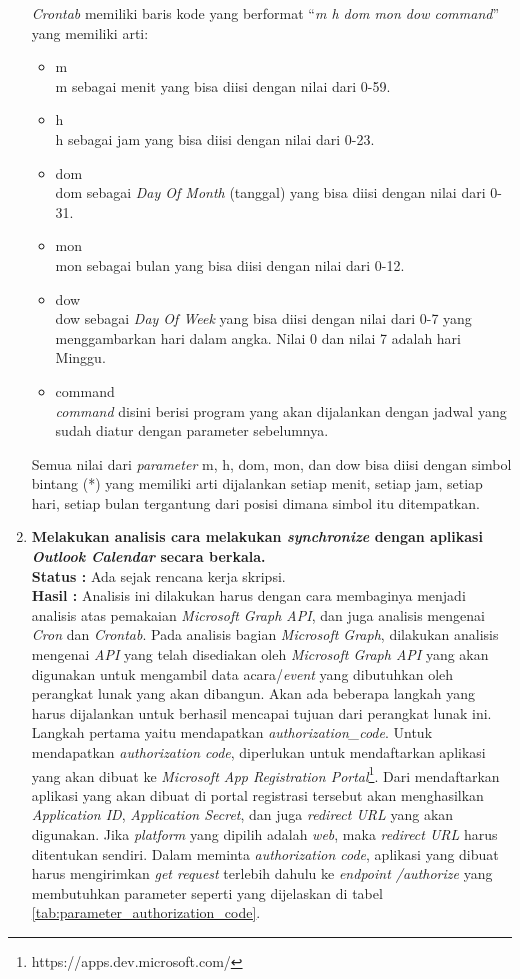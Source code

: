 \documentclass[a4paper,twoside]{article}
\begin{document}
\begin{enumerate}
\textit{Crontab} memiliki baris kode yang berformat ``\textit{m h dom mon dow command}'' yang memiliki arti:
\begin{itemize}
	\item m\\
	m sebagai menit yang bisa diisi dengan nilai dari 0-59. 
	\item h\\
	h sebagai jam yang bisa diisi dengan nilai dari 0-23.
	\item dom\\
	dom sebagai \textit{Day Of Month} (tanggal) yang bisa diisi dengan nilai dari 0-31.
	\item mon\\
	mon sebagai bulan yang bisa diisi dengan nilai dari 0-12.
	\item dow\\
	dow sebagai \textit{Day Of Week} yang bisa diisi dengan nilai dari 0-7 yang menggambarkan hari dalam angka. Nilai 0 dan nilai 7 adalah hari Minggu. 
	\item command\\
	\textit{command} disini berisi program yang akan dijalankan dengan jadwal yang sudah diatur dengan parameter sebelumnya. 
\end{itemize}

Semua nilai dari \textit{parameter} m, h, dom, mon, dan dow bisa diisi dengan simbol bintang (*) yang memiliki arti dijalankan setiap menit, setiap jam, setiap hari, setiap bulan tergantung dari posisi dimana simbol itu ditempatkan. 

		\item \textbf{Melakukan analisis cara melakukan \textit{synchronize} dengan aplikasi \textit{Outlook Calendar} secara berkala.}\\
		{\bf Status :} Ada sejak rencana kerja skripsi.\\
		{\bf Hasil :} Analisis ini dilakukan harus dengan cara membaginya menjadi analisis atas pemakaian \textit{Microsoft Graph API}, dan juga analisis mengenai \textit{Cron} dan \textit{Crontab}. Pada analisis bagian \textit{Microsoft Graph}, dilakukan analisis mengenai \textit{API} yang telah disediakan oleh \textit{Microsoft Graph API} yang akan digunakan untuk mengambil data acara/\textit{event} yang dibutuhkan oleh perangkat lunak yang akan dibangun. Akan ada beberapa langkah yang harus dijalankan untuk berhasil mencapai tujuan dari perangkat lunak ini. Langkah pertama yaitu mendapatkan \textit{authorization\_code}. Untuk mendapatkan \textit{authorization code}, diperlukan untuk mendaftarkan aplikasi yang akan dibuat ke \textit{Microsoft App Registration Portal}\footnote{https://apps.dev.microsoft.com/}. Dari mendaftarkan aplikasi yang akan dibuat di portal registrasi tersebut akan menghasilkan \textit{Application ID}, \textit{Application Secret}, dan juga \textit{redirect URL} yang akan digunakan. Jika \textit{platform} yang dipilih adalah \textit{web}, maka \textit{redirect URL} harus ditentukan sendiri. Dalam meminta \textit{authorization code}, aplikasi yang dibuat harus mengirimkan \textit{get request} terlebih dahulu ke \textit{endpoint /authorize} yang membutuhkan parameter seperti yang dijelaskan di tabel \ref{tab:parameter_authorization_code}. 


\end{enumerate}
\end{document}
